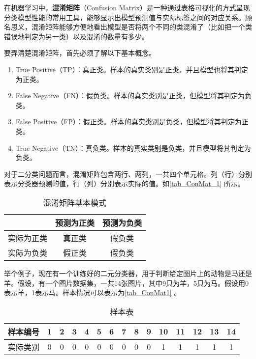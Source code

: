 

在机器学习中，\textbf{混淆矩阵}（Confusion Matrix）是一种通过表格可视化的方式呈现分类模型性能的常用工具，能够显示出模型预测值与实际标签之间的对应关系。顾名思义，混淆矩阵能够方便地看出模型是否将两个不同的类混淆了（比如把一个类错误地判定为另一类）以及混淆的数量有多少。

要弄清楚混淆矩阵，首先必须了解以下基本概念。

\begin{enumerate}
\item True Positive（TP）：真正类。样本的真实类别是正类，并且模型也将其判定为正类。
\item False Negative（FN）：假负类。样本的真实类别是正类，但模型将其判定为负类。
\item False Positive（FP）：假正类。样本的真实类别是负类，但模型将其判定为正类。
\item True Negative（TN）：真负类。样本的真实类别是负类，并且模型将其判定为负类。 
\end{enumerate}

对于二分类问题而言，混淆矩阵包含两行、两列，一共四个单元格。列（行）分别表示分类器预测的值，行（列）分别表示实际的值。如\autoref{tab_ConMat_1} 所示。

\begin{table}[ht]
\centering
\caption{混淆矩阵基本模式}\label{tab_ConMat_1}
\begin{tabular}{|c|c|c|}
\hline
 & 预测为正类 & 预测为负类 \\
\hline
实际为正类 & 真正类 & 假负类 \\
\hline
实际为负类 & 假正类 & 假负类 \\
\hline
\end{tabular}
\end{table}

举个例子，现在有一个训练好的二元分类器，用于判断给定图片上的动物是马还是羊。假设，有一个图片数据集，一共14张图片，其中9只为羊，5只为马。假设用0表示羊，1表示马。样本情况可以表示为\autoref{tab_ConMat1} 。

\begin{table}[ht]
\centering
\caption{样本表}\label{tab_ConMat1}
\begin{tabular}{|c|c|c|c|c|c|c|c|c|c|c|c|c|c|c|}
\hline
样本编号 & 1 & 2 & 3 & 4 & 5 & 6 & 7 & 8 & 9 & 10 & 11 & 12 & 13 & 14 \\
\hline
实际类别 & 0 & 0 & 0 & 0 & 0 & 0 & 0 & 0 & 0 & 1 & 1 & 1 & 1 & 1 \\
\hline
\end{tabular}
\end{table}

